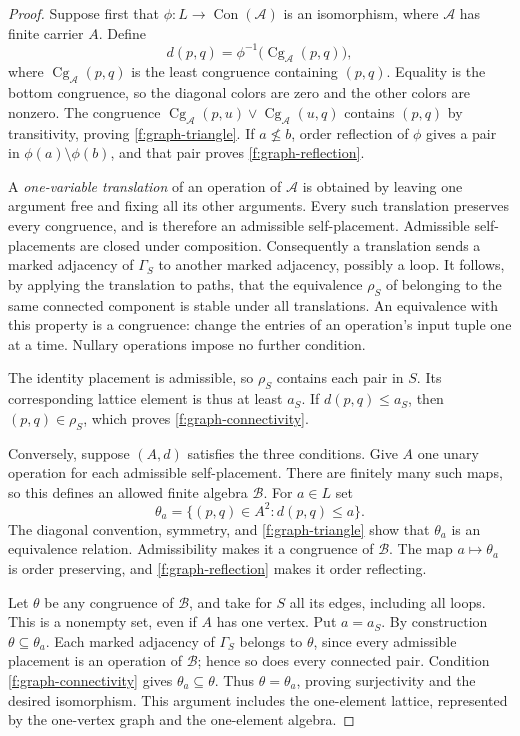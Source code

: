 \begin{proof}
Suppose first that $\phi:L\to\operatorname{Con}(\mathcal A)$ is an isomorphism,
where $\mathcal A$ has finite carrier $A$. Define
\[
 d(p,q)=\phi^{-1}\bigl(\operatorname{Cg}_{\mathcal A}(p,q)\bigr),
\]
where $\operatorname{Cg}_{\mathcal A}(p,q)$ is the least congruence containing
$(p,q)$. Equality is the bottom congruence, so the diagonal colors are zero
and the other colors are nonzero. The congruence
$\operatorname{Cg}_{\mathcal A}(p,u)\vee
\operatorname{Cg}_{\mathcal A}(u,q)$ contains $(p,q)$ by transitivity, proving
\ref{f:graph-triangle}. If $a\not\le b$, order reflection of $\phi$ gives a
pair in $\phi(a)\setminus\phi(b)$, and that pair proves
\ref{f:graph-reflection}.

A \emph{one-variable translation} of an operation of $\mathcal A$ is obtained
by leaving one argument free and fixing all its other arguments. Every such
translation preserves every congruence, and is therefore an admissible
self-placement. Admissible self-placements are closed under composition.
Consequently a translation sends a marked adjacency of $\Gamma_S$ to another
marked adjacency, possibly a loop. It follows, by applying the translation
to paths, that the equivalence $\rho_S$ of belonging to the same connected
component is stable under all translations. An equivalence with this
property is a congruence: change the entries of an operation's input tuple
one at a time. Nullary operations impose no further condition.

The identity placement is admissible, so $\rho_S$ contains each pair in $S$.
Its corresponding lattice element is thus at least $a_S$. If
$d(p,q)\le a_S$, then $(p,q)\in\rho_S$, which proves
\ref{f:graph-connectivity}.

Conversely, suppose $(A,d)$ satisfies the three conditions. Give $A$ one unary
operation for each admissible self-placement. There are finitely many such
maps, so this defines an allowed finite algebra $\mathcal B$. For $a\in L$ set
\[
 \theta_a=\{(p,q)\in A^2:d(p,q)\le a\}.
\]
The diagonal convention, symmetry, and \ref{f:graph-triangle} show that
$\theta_a$ is an equivalence relation. Admissibility makes it a congruence of
$\mathcal B$. The map $a\mapsto\theta_a$ is order preserving, and
\ref{f:graph-reflection} makes it order reflecting.

Let $\theta$ be any congruence of $\mathcal B$, and take for $S$ all its edges,
including all loops. This is a nonempty set, even if $A$ has one vertex.
Put $a=a_S$. By construction $\theta\subseteq\theta_a$. Each marked adjacency
of $\Gamma_S$ belongs to $\theta$, since every admissible placement is an
operation of $\mathcal B$; hence so does every connected pair. Condition
\ref{f:graph-connectivity} gives $\theta_a\subseteq\theta$. Thus
$\theta=\theta_a$, proving surjectivity and the desired isomorphism. This
argument includes the one-element lattice, represented by the one-vertex
graph and the one-element algebra.
\end{proof}

